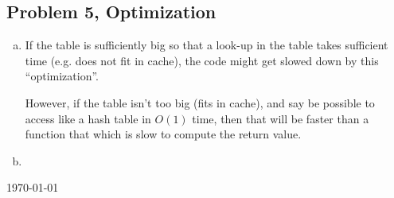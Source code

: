 \documentclass[fontsize=11pt, paper=a4, titlepage]{article}
\begin{document}
\subsection{Problem 5, Optimization}
\begin{enumerate}[a)]

    \item If the table is sufficiently big so that a look-up in the table takes
sufficient time (e.g. does not fit in cache), the code might get slowed down by this ``optimization''.

However, if the table isn't too big (fits in cache), and say be possible to
access like a hash table in $O(1)$ time, then that will be faster than a
function that which is slow to compute the return value.

    \item

\end{enumerate}

\vfill
\hfill \large{\today}
\end{document}
